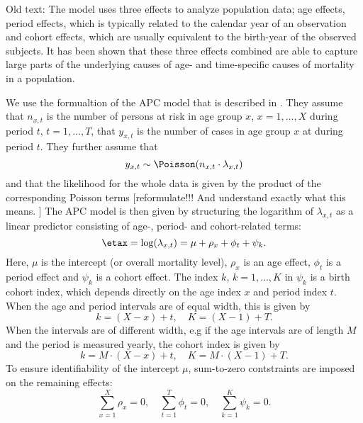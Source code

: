 \textcolor{myDarkGreen}{Old text: }
The model uses three effects to analyze population data; age effects, period effects, which is typically related to the calendar year of an observation and cohort effects, which are usually equivalent to the birth-year of the observed subjects. It has been shown that these three effects combined are able to capture large parts of the underlying causes of age- and time-specific causes of mortality in a population. 

We use the formualtion of the APC model that is described in \citet{rieblerHeld2010}. 
They assume that $n_{x,t}$ is the number of persons at risk in age group $x$, $x = 1,\ldots,X$ during period $t$, $t = 1,\ldots,T$, that $y_{x,t}$ is the number of cases in age group $x$ at during period $t$. They further assume that 
\begin{equation}
    y_{x,t} \sim \Poisson(n_{x,t}\cdot \lambda_{x,t})
\end{equation}
and that the likelihood for the whole data is given by the product of the corresponding Poisson terms [reformulate!!! And understand exactly what this means. ]
The APC model is then given by structuring the logarithm of $\lambda_{x,t}$ as a linear predictor consisting of age-, period- and cohort-related terms:
\begin{equation}
    \etax = \log(\lambda_{x,t}) = \mu + \rho_x + \phi_t + \psi_k.
    \label{eq:APCmodel}
\end{equation}
Here, $\mu$ is the intercept (or overall mortality level), $\rho_x$ is an age effect, $\phi_t$ is a period effect and $\psi_k$ is a cohort effect. The index $k$, $k = 1,\ldots,K$ in $\psi_k$ is a birth cohort index, which depends directly on the age index $x$ and period index $t$. When the age and period intervals are of equal width, this is given by
\begin{equation*}
    k = (X - x) + t, \quad K = (X - 1) + T.
\end{equation*}
When the intervals are of different width, e.g if the age intervals are of length $M$ and the period is measured yearly, the cohort index is given by
\begin{equation}
    k = M \cdot (X - x) + t, \quad K = M \cdot (X - 1) + T.
    \label{eq:cohortIndex}
\end{equation}
To ensure identifiability of the intercept $\mu$, sum-to-zero contstraints are imposed on the remaining effects:
\begin{equation}
    \sum_{x = 1}^{X}\rho_x = 0, \quad \sum_{t = 1}^T\phi_t = 0, \quad \sum_{k = 1}^K \psi_k = 0. 
    \label{eq:APCconstraints}
\end{equation}